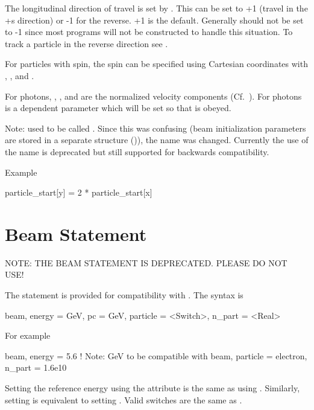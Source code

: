 The longitudinal direction of travel is set by .  This can be set
to +1 (travel in the +s direction) or -1 for the reverse.  +1 is the default. Generally
 should not be set to -1 since most programs will not be
constructed to handle this situation. To track a particle in the reverse direction see
. 

For particles with spin, the spin can be specified using Cartesian coordinates with ,
, and .

For photons, , , and  are the normalized velocity components
(Cf.~). For photons  is a dependent parameter which will be set so that 
is obeyed.

Note:  used to be called . Since this was confusing (beam
initialization parameters are stored in a separate  structure
()), the name was changed. Currently the use of the  name
is deprecated but still supported for backwards compatibility.

Example
\begin{example}
  particle_start[y] = 2 * particle_start[x]
\end{example}

\section{Beam Statement}
\label{s:beam.mad}

NOTE: THE BEAM STATEMENT IS DEPRECATED. PLEASE DO NOT USE!

The  statement is provided for compatibility with \mad. The syntax is
\begin{example}
  beam, energy = GeV, pc = GeV, particle = <Switch>, n_part = <Real>
\end{example}
For example
\begin{example}
  beam, energy = 5.6  ! Note: GeV to be compatible with \mad
  beam, particle = electron, n_part = 1.6e10
\end{example}
Setting the reference energy using the  attribute is the
same as using . Similarly, setting  is
equivalent to setting . Valid  switches
are the same as .

